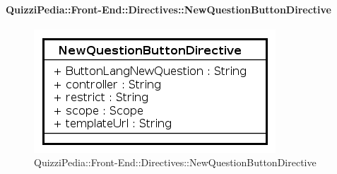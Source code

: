 \paragraph{QuizziPedia::Front-End::Directives::NewQuestionButtonDirective}

\label{QuizziPedia::Front-End::Directives::NewQuestionButtonDirective}

\begin{figure}[ht]
	\centering
	\includegraphics[scale=0.80,keepaspectratio]{UML/Classi/Front-End/QuizziPedia_Front-end_Directives_NewQuestionButtonDirective.png}
	\caption{QuizziPedia::Front-End::Directives::NewQuestionButtonDirective}
\end{figure} 
\FloatBarrier

